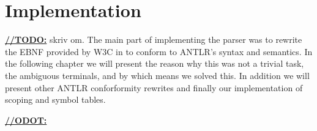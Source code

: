 \chapter{Implementation}

\underline{\textbf{\LARGE //TODO:}} skriv om.
The main part of implementing the parser was to rewrite the EBNF provided by W3C in \cite{w3c01} to conform to ANTLR's syntax and semantics. In the following chapter we will present the reason why this was not a trivial task, the ambiguous terminals, and by which means we solved this. In addition we will present other ANTLR conforformity rewrites and finally our implementation of scoping and symbol tables.

\underline{\textbf{\LARGE //ODOT:}}





